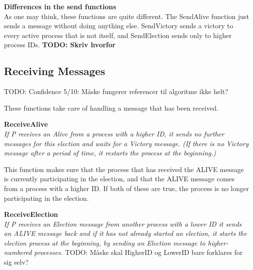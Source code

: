 \documentclass{article}
\begin{document}
\textbf{Differences in the send functions}\\
As one may think, these functions are quite different. The SendAlive function just sends a message without doing anything else. SendVictory sends a victory to every active process that is not itself, and SendElection sends only to higher process IDs.
\textbf{TODO: Skriv hvorfor}

\subsection{Receiving Messages}
TODO: Confidence 5/10: Måske fungerer referencer til algoritme ikke helt?

\noindent{}

These functions take care of handling a message that has been received.

\textbf{ReceiveAlive}\\
\textit{If P receives an Alive from a process with a higher ID, it sends no further messages for this election and waits for a Victory message. (If there is no Victory message after a period of time, it restarts the process at the beginning.)}

This function makes sure that the process that has received the ALIVE message is currently participating in the election, and that the ALIVE message comes from a process with a higher ID. If both of these are true, the process is no longer participating in the election.

\textbf{ReceiveElection}\\
\textit{If P receives an Election message from another process with a lower ID it sends an ALIVE message back and if it has not already started an election, it starts the election process at the beginning, by sending an Election message to higher-numbered processes.}
TODO: Måske skal HigherID og LowerID bare forklares for sig selv?
\end{document}
